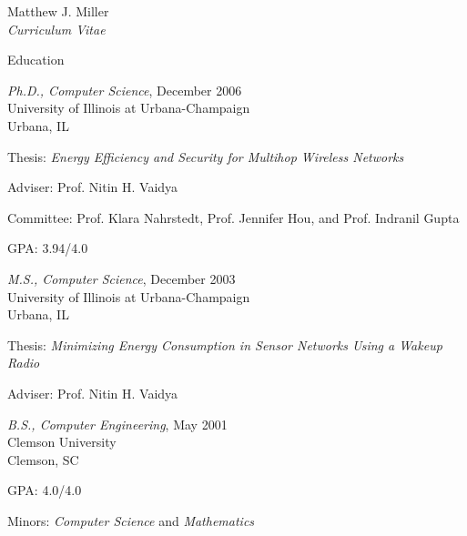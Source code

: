 \documentclass[10pt]{article}
\newenvironment{sublist}{%
    \begin{list}{}{%
        \setlength{\itemsep}{0em}\setlength{\parsep}{0em}%
        \setlength{\topsep}{0em}\setlength{\parskip}{0em}%
    }%
}%
{ \end{list} }
\begin{document}
\begin{cv}{Matthew J. Miller\\{\large \itshape Curriculum Vitae}}
\begin{cvlist}{Education}
    \item \emph{Ph.D., Computer Science}, December 2006\\
    University of Illinois at Urbana-Champaign\\
    Urbana, IL
    \begin{sublist}
        \item Thesis: \textit{Energy Efficiency and Security
        for Multihop Wireless Networks}
        \item Adviser: Prof. Nitin H. Vaidya
        \item Committee: Prof. Klara Nahrstedt, Prof. Jennifer Hou,
        and Prof. Indranil Gupta
        \item GPA: 3.94/4.0
    \end{sublist}
    \item \emph{M.S., Computer Science}, December 2003\\ 
    University of Illinois at Urbana-Champaign\\
    Urbana, IL
    \begin{sublist}
        \item Thesis: \textit{Minimizing Energy Consumption in Sensor
        Networks Using a Wakeup Radio}
        \item Adviser: Prof. Nitin H. Vaidya
    \end{sublist}
    \item \emph{B.S., Computer Engineering}, May 2001\\
    Clemson University\\
    Clemson, SC
    \begin{sublist}
        \item GPA: 4.0/4.0
        \item Minors: \emph{Computer Science} and \emph{Mathematics}
    \end{sublist}
\end{cvlist}


\end{cv}
\end{document}

